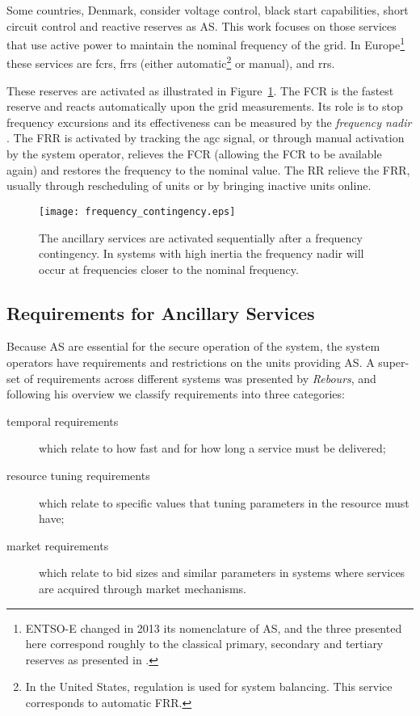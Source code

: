 Some countries, \eg Denmark, consider voltage control, black start capabilities, short circuit control and reactive reserves as AS. This work focuses on those services that use active power to maintain the nominal frequency of the grid. In Europe\footnote{ENTSO-E changed in 2013 its nomenclature of AS, and the three presented here correspond roughly to the classical primary, secondary and tertiary reserves as presented in \cite{Rebours}.} these services are \glspl{fcr}, \glspl{frr} (either automatic\footnote{In the United States, regulation is used for system balancing. This service corresponds to automatic FRR.} or manual), and \glspl{rr}.

These reserves are activated as illustrated in Figure~\ref{fig:MAINfreqcont}. The FCR is the fastest reserve and reacts automatically upon the grid measurements. Its role is to stop frequency excursions and its effectiveness can be measured by the \emph{frequency nadir} \cite{eto2010use}. The FRR is activated by tracking the \gls{agc} signal, or through manual activation by the system operator, relieves the FCR (allowing the FCR to be available again) and restores the frequency to the nominal value. The RR relieve the FRR, usually through rescheduling of units or by bringing inactive units online.

\begin{figure}[htbp!]
\centering
\texttt{[image: frequency\_contingency.eps]}
\caption{The ancillary services are activated sequentially after a frequency contingency. In systems with high inertia the frequency nadir will occur at frequencies closer to the nominal frequency.}
\label{fig:MAINfreqcont}
\end{figure}

\subsection{Requirements for Ancillary Services} %
\label{sub:servreqAS}
Because AS are essential for the secure operation of the system, the system operators have requirements and restrictions on the units providing AS. A super-set of requirements across different systems was presented by \emph{Rebours}, and following his overview we classify requirements into three categories:
\begin{description}
	\item[temporal requirements] which relate to how fast and for how long a service must be delivered;
	\item[resource tuning requirements] which relate to specific values that tuning parameters in the resource must have;
	\item[market requirements] which relate to bid sizes and similar parameters in systems where services are acquired through market mechanisms.
\end{description}


